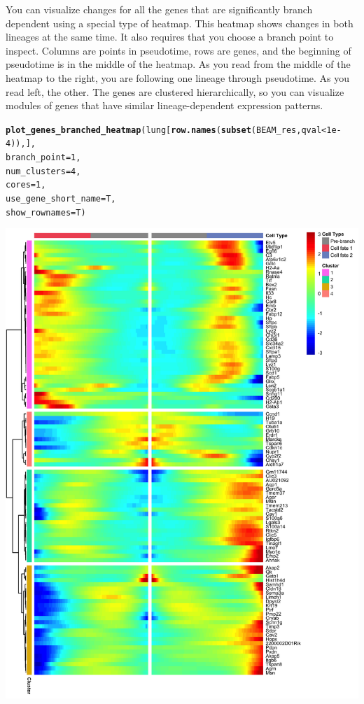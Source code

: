 \documentclass[10pt,oneside]{article}\usepackage[]{graphicx}\usepackage[]{color}
\makeatletter
\def\maxwidth{ %
  \ifdim\Gin@nat@width>\linewidth
    \linewidth
  \else
    \Gin@nat@width
  \fi
}
\newcommand{\hlnum}[1]{\textcolor[rgb]{0.686,0.059,0.569}{#1}}%
\newcommand{\hlopt}[1]{\textcolor[rgb]{0,0,0}{#1}}%
\newcommand{\hlstd}[1]{\textcolor[rgb]{0.345,0.345,0.345}{#1}}%
\newcommand{\hlkwc}[1]{\textcolor[rgb]{0.333,0.667,0.333}{#1}}%
\newcommand{\hlkwd}[1]{\textcolor[rgb]{0.737,0.353,0.396}{\textbf{#1}}}%
\newenvironment{kframe}{%
 \def\at@end@of@kframe{}%
 \ifinner\ifhmode%
  \def\at@end@of@kframe{\end{minipage}}%
  \begin{minipage}{\columnwidth}%
 \fi\fi%
 \def\FrameCommand##1{\hskip\@totalleftmargin \hskip-\fboxsep
 \colorbox{shadecolor}{##1}\hskip-\fboxsep
     \hskip-\linewidth \hskip-\@totalleftmargin \hskip\columnwidth}%
 \MakeFramed {\advance\hsize-\width
   \@totalleftmargin\z@ \linewidth\hsize
   \@setminipage}}%
 {\par\unskip\endMakeFramed%
 \at@end@of@kframe}
\newenvironment{knitrout}{}{} %
\makeatother
\begin{document}
You can visualize changes for all the genes that are significantly branch dependent using a special type of heatmap. This heatmap shows changes in both lineages at the same time. It also requires that you choose a branch point to inspect. Columns are points in pseudotime, rows are genes, and the beginning of pseudotime is in the middle of the heatmap. As you read from the middle of the heatmap to the right, you are following one lineage through pseudotime. As you read left, the other. The genes are clustered hierarchically, so you can visualize modules of genes that have similar lineage-dependent expression patterns.
\begin{knitrout}
\color{fgcolor}\begin{kframe}
\begin{alltt}
\hlkwd{plot_genes_branched_heatmap}\hlstd{(lung[}\hlkwd{row.names}\hlstd{(}\hlkwd{subset}\hlstd{(BEAM_res, qval} \hlopt{<} \hlnum{1e-4}\hlstd{)),],}
                            \hlkwc{branch_point} \hlstd{=} \hlnum{1}\hlstd{,}
                            \hlkwc{num_clusters} \hlstd{=} \hlnum{4}\hlstd{,}
                            \hlkwc{cores} \hlstd{=} \hlnum{1}\hlstd{,}
                            \hlkwc{use_gene_short_name} \hlstd{= T,}
                            \hlkwc{show_rownames} \hlstd{= T)}
\end{alltt}
\end{kframe}

{\centering \includegraphics[width=\maxwidth]{figure/lung_beam_branched_heatmap-1} 

}
\end{knitrout}
\end{document}
